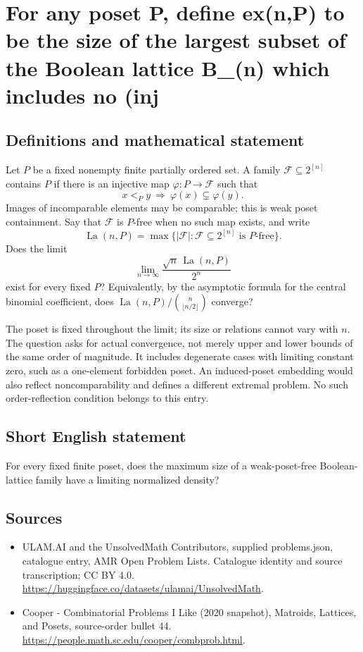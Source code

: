 \documentclass[11pt,a4paper]{article}
\begin{document}
\section*{For any poset P, define ex(n,P) to be the size of the largest subset of the Boolean lattice B\_(n) which includes no (inj}\label{statement}

\subsection{Definitions and mathematical statement}
Let $P$ be a fixed nonempty finite partially ordered set. A family
$\mathcal F\subseteq2^{[n]}$ contains $P$ if there is an injective
map $\varphi:P\to\mathcal F$ such that
\[
                  x<_P y\ \Longrightarrow\
                         \varphi(x)\subsetneq\varphi(y).
\]
Images of incomparable elements may be comparable; this is weak
poset containment. Say that $\mathcal F$ is $P$-free when no such
map exists, and write
\[
 \operatorname{La}(n,P)
   =\max\{|\mathcal F|:\mathcal F\subseteq2^{[n]}
                                      \text{ is }P\text{-free}\}.
\]
Does the limit
\[
                 \lim_{n\to\infty}
                    \frac{\sqrt n\,\operatorname{La}(n,P)}{2^n}
\]
exist for every fixed $P$? Equivalently, by the asymptotic formula
for the central binomial coefficient, does
$\operatorname{La}(n,P)/\binom n{\lfloor n/2\rfloor}$ converge?

The poset is fixed throughout the limit; its size or relations
cannot vary with $n$. The question asks for actual convergence,
not merely upper and lower bounds of the same order of magnitude.
It includes degenerate cases with limiting constant zero, such
as a one-element forbidden poset. An induced-poset embedding
would also reflect noncomparability and defines a different
extremal problem. No such order-reflection condition belongs to
this entry.
\subsection{Short English statement}
For every fixed finite poset, does the maximum size of a weak-poset-free Boolean-lattice family have a limiting normalized density?
\subsection{Sources}
\begin{itemize}
\item[S1] ULAM.AI and the UnsolvedMath Contributors, supplied problems.json, catalogue entry, AMR Open Problem Lists. Catalogue identity and source transcription; CC BY 4.0.
\url{https://huggingface.co/datasets/ulamai/UnsolvedMath}.
\item[S2] Cooper - Combinatorial Problems I Like (2020 snapshot), Matroids, Lattices, and Posets, source-order bullet 44. 
\url{https://people.math.sc.edu/cooper/combprob.html}.
\end{itemize}
\end{document}
